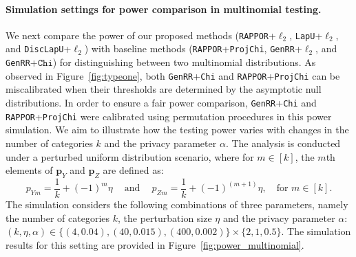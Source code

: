 \documentclass[twoside,11pt]{article}
\newcommand{\rvTwo}{Y}
\newcommand{\rvThree}{Z}
\newcommand{\vectorize}[1]{\mathbf{#1}}
\newcommand{\alphabetSize}{k} %
\newcommand{\vectorIndex}{m}
\newcommand{\probVecElement}[2]{p_{{#1}{#2}}}
\newcommand{\privacyParameter}{\alpha} %
\begin{document}
\paragraph{Simulation settings for power comparison in multinomial testing.}
We next compare the power of our proposed methods (\texttt{RAPPOR}+$\ell_2$, \texttt{LapU}+$\ell_2$, and \texttt{DiscLapU}+$\ell_2$) with baseline methods (\texttt{RAPPOR}+\texttt{ProjChi}, \texttt{GenRR}+$\ell_2$, and \texttt{GenRR}+$\texttt{Chi}$) for distinguishing between two multinomial distributions. As observed in Figure~\ref{fig:typeone}, both \texttt{GenRR}+\texttt{Chi} and \texttt{RAPPOR}+\texttt{ProjChi} can be miscalibrated when their thresholds are determined by the asymptotic null distributions. In order to ensure a fair power comparison, \texttt{GenRR}+\texttt{Chi} and \texttt{RAPPOR}+\texttt{ProjChi} were calibrated using permutation procedures in this power simulation. We aim to illustrate how the testing power varies with changes in the number of categories  $\alphabetSize$ and the privacy parameter $\privacyParameter$. The analysis is conducted under a perturbed uniform distribution scenario, where for \( m \in [\alphabetSize] \), the \( m \)th elements of \( \vectorize{p}_Y \) and \( \vectorize{p}_Z \) are defined as:
\begin{equation}\label{simulation_setting:perturbed_uniform}
	\probVecElement{\rvTwo}{\vectorIndex} = \frac{1}{\alphabetSize} + (-1)^\vectorIndex \eta~\quad \text{and} \quad~	\probVecElement{\rvThree}{\vectorIndex} = \frac{1}{\alphabetSize} + (-1)^{(\vectorIndex+1)} \eta, \quad \text{for $\vectorIndex \in [\alphabetSize]$.}
\end{equation}
The simulation considers the following combinations of three parameters, namely the number of categories $\alphabetSize$, the perturbation size $\eta$ and the privacy parameter $\privacyParameter$: $(\alphabetSize, \eta, \privacyParameter) \in \{(4,0.04), (40,0.015), (400,0.002)\} \times \{2, 1, 0.5\}$. The simulation results for this setting are provided in Figure~\ref{fig:power_multinomial}. 
\end{document}
